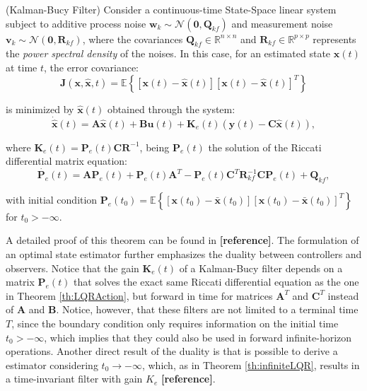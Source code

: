 \documentclass[a4paper,11pt]{book}
\numberwithin{figure}{chapter}
\numberwithin{equation}{chapter}
\numberwithin{table}{chapter}
\newtheorem{theorem}{Theorem}[chapter]
\theoremstyle{definition}
\newcounter{boxed-theorem}
\newenvironment{boxed-theorem}[1]
{\begin{shaded} \begin{theorem}{#1}}
{\end{theorem} \end{shaded}}
\newcounter{boxed-definition}
\begin{document}
\begin{boxed-theorem}{(Kalman-Bucy Filter)} \label{th:kalmanBucy}
    Consider a continuous-time State-Space linear system subject to additive process noise $\bm{w}_k \sim \mathcal{N}(\bm{0}, \bm{Q}_{kf})$ and measurement noise $\bm{v}_k \sim \mathcal{N}(\bm{0}, \bm{R}_{kf})$, where the covariances $\bm{Q}_{kf} \in \mathbb{R}^{n \times n}$  and $\bm{R}_{kf} \in \mathbb{R}^{p \times p}$ represents the \emph{power spectral density} of the noises.   In this case, for an estimated state $\hat{\bm{x}}(t)$ at time $t$, the error covariance:
    \begin{equation}
        \bm{J}(\bm{x}, \hat{\bm{x}}, t) = \mathbb{E}\left\{ [\bm{x}(t) - \hat{\bm{x}}(t)][\bm{x}(t) - \hat{\bm{x}}(t)]^T \right\}
    \end{equation}
    
    \noindent is minimized by $\hat{\bm{x}}(t)$ obtained through the system:
    \begin{equation}
        \dot{\hat{\bm{x}}}(t) = \bm{A} \hat{\bm{x}}(t) + \bm{B} \bm{u}(t) + \bm{K}_{e}(t) \left( \bm{y}(t) - \bm{C} \hat{\bm{x}}(t) \right)
    ,\end{equation}
    
    \noindent where $\bm{K}_e(t) = \bm{P}_e(t)\bm{C}\bm{R}^{-1}$, being $\bm{P}_e(t)$ the solution of the Riccati differential matrix equation:
    \begin{equation}
        \dot{\bm{P}_e}(t) = \bm{A} \bm{P}_e(t) + \bm{P}_e(t) \bm{A}^T - \bm{P}_e(t)\bm{C}^T\bm{R}_{kf}^{-1} \bm{C} \bm{P}_e(t) + \bm{Q}_{kf}
    ,\end{equation}
    
    \noindent with initial condition $\bm{P}_e(t_0) = \mathbb{E} \left\{ [\bm{x}(t_0) - \bar{\bm{x}}(t_0)][\bm{x}(t_0) - \bar{\bm{x}}(t_0)]^T \right\}$ for $t_0 > -\infty$.
\end{boxed-theorem}

A detailed proof of this theorem can be found in \textbf{[reference]}. The formulation of an optimal state estimator further emphasizes the duality between controllers and observers. Notice that the gain $\bm{K}_e(t)$ of a Kalman-Bucy filter depends on a matrix $\bm{P}_e(t)$ that solves the exact same Riccati differential equation as the one in Theorem \ref{th:LQRAction}, but forward in time for matrices $\bm{A}^T$ and $\bm{C}^T$ instead of $\bm{A}$ and $\bm{B}$. Notice, however, that these filters are not limited to a terminal time $T$, since the boundary condition only requires information on the initial time $t_0 > -\infty$, which implies that they could also be used in forward infinite-horizon operations. Another direct result of the duality is that is possible to derive a estimator considering $t_0 \to -\infty$, which, as in Theorem \ref{th:infiniteLQR}, results in a time-invariant filter with gain $K_e$ \textbf{[reference]}.
\end{document}
